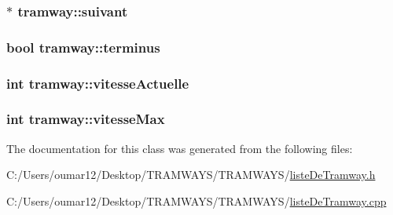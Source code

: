 \subsubsection[{\texorpdfstring{suivant}{suivant}}]{$\ast$ tramway\+::suivant}\hypertarget{classtramway_a1ed327c50d74d61632664f0f460c6cf2}{}\label{classtramway_a1ed327c50d74d61632664f0f460c6cf2}
\subsubsection[{\texorpdfstring{terminus}{terminus}}]{\setlength{\rightskip}{0pt plus 5cm}bool tramway\+::terminus}\hypertarget{classtramway_acfb0a0666823107c15ac26f074a67d79}{}\label{classtramway_acfb0a0666823107c15ac26f074a67d79}
\subsubsection[{\texorpdfstring{vitesse\+Actuelle}{vitesseActuelle}}]{\setlength{\rightskip}{0pt plus 5cm}int tramway\+::vitesse\+Actuelle}\hypertarget{classtramway_a5eab187ab73b4b91a158dc05fd8ed066}{}\label{classtramway_a5eab187ab73b4b91a158dc05fd8ed066}
\subsubsection[{\texorpdfstring{vitesse\+Max}{vitesseMax}}]{\setlength{\rightskip}{0pt plus 5cm}int tramway\+::vitesse\+Max}\hypertarget{classtramway_a401f568b9c8cedcf0c359eb68ea8865d}{}\label{classtramway_a401f568b9c8cedcf0c359eb68ea8865d}


The documentation for this class was generated from the following files\+:\begin{DoxyCompactItemize}
\item 
C\+:/\+Users/oumar12/\+Desktop/\+T\+R\+A\+M\+W\+A\+Y\+S/\+T\+R\+A\+M\+W\+A\+Y\+S/\hyperlink{liste_de_tramway_8h}{liste\+De\+Tramway.\+h}\item 
C\+:/\+Users/oumar12/\+Desktop/\+T\+R\+A\+M\+W\+A\+Y\+S/\+T\+R\+A\+M\+W\+A\+Y\+S/\hyperlink{liste_de_tramway_8cpp}{liste\+De\+Tramway.\+cpp}\end{DoxyCompactItemize}
